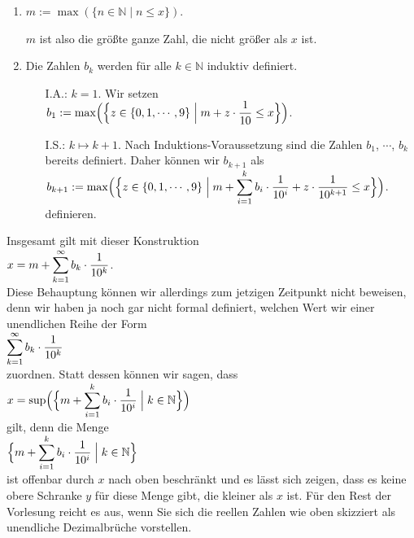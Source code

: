 \begin{enumerate}
\item $m := \max(\{ n \in \mathbb{N} \mid n \leq x \})$.

      $m$ ist also die gr\"o\ss{}te ganze Zahl, die nicht gr\"o\ss{}er als $x$ ist.
\item Die Zahlen $b_k$ werden f\"ur alle $k \in \mathbb{N}$ induktiv definiert.
      \begin{enumerate}
      \item[I.A.:] $k=1$.  Wir setzen
                   \\[0.2cm]
                   \hspace*{1.3cm}
                   $\displaystyle b_1 := \max\Bigl(\Bigl\{ z \in \{ 0, 1, \cdots, 9 \} \Bigm| m + z \cdot \frac{1}{10} \leq x\Bigr\}\Bigr)$.
      \item[I.S.:] $k \mapsto k+1$.  Nach Induktions-Voraussetzung sind die Zahlen $b_1$, $\cdots$, $b_k$
                   bereits definiert.  Daher k\"onnen wir $b_{k+1}$ als
                   \\[0.2cm]
                   \hspace*{1.3cm}
                   $\displaystyle b_{k+1} := \max\Bigl(\Bigl\{ z \in \{ 0, 1, \cdots, 9 \} \Bigm| m + \sum\limits_{i=1}^{k} b_i \cdot \frac{1}{10^i} + z \cdot \frac{1}{10^{k+1}}\leq x\Bigr\}\Bigr)$.
                   \\[0.2cm]
                   definieren.
      \end{enumerate}
\end{enumerate}
Insgesamt gilt mit dieser Konstruktion
\\[0.2cm]
\hspace*{1.3cm}
$\displaystyle x = m + \sum\limits_{k=1}^{\infty} b_k \cdot \frac{1}{10^{k}}$.
\\[0.2cm]
Diese Behauptung k\"onnen wir allerdings zum jetzigen Zeitpunkt nicht beweisen, denn wir haben ja noch gar nicht formal
definiert, welchen Wert wir einer unendlichen Reihe der Form
\\[0.2cm]
\hspace*{1.3cm}
$\displaystyle \sum\limits_{k=1}^{\infty} b_k \cdot \frac{1}{10^{k}}$
\\[0.2cm]
zuordnen.  Statt dessen k\"onnen wir sagen, dass
\\[0.2cm]
\hspace*{1.3cm}
$\displaystyle x = \sup\Bigl(\Bigl\{ m + \sum\limits_{i=1}^{k} b_i \cdot \frac{1}{10^{i}} \Bigm| k \in \mathbb{N} \Bigr\}\Bigr)$
\\[0.2cm]
gilt, denn die Menge
\\[0.2cm]
\hspace*{1.3cm}
$\displaystyle \Bigl\{ m + \sum\limits_{i=1}^{k} b_i \cdot \frac{1}{10^{i}} \Bigm| k \in \mathbb{N} \Bigr\}$
\\[0.2cm]
ist offenbar durch $x$ nach oben beschr\"ankt und es l\"asst sich zeigen, dass es keine 
obere Schranke $y$ f\"ur diese Menge gibt, die  kleiner als $x$ ist.  F\"ur den Rest der Vorlesung
reicht es aus, wenn Sie sich die reellen Zahlen wie oben skizziert als unendliche Dezimalbr\"uche vorstellen.



